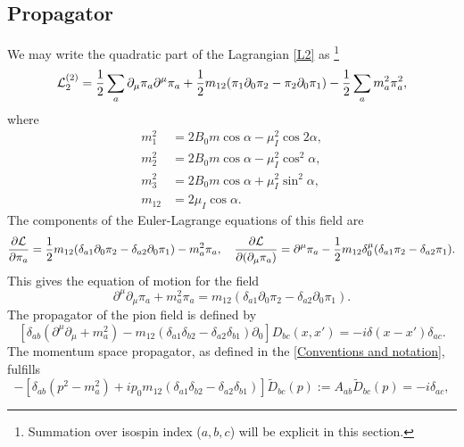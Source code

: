 \subsection{Propagator}
\label{section:propagator}
We may write the quadratic part of the Lagrangian \autoref{L2} as \footnote{Summation over isospin index ($a,b,c$) will be explicit in this section.}
\begin{align}
    \label{quadratic lagrangian}
    \mathcal{L}_2^{(2)}
    =
    \frac{1}{2} \sum_a \partial_\mu \pi_a \partial^\mu \pi_a
    + \frac{1}{2} m_{12} (\pi_1 \partial_0 \pi_2 - \pi_2 \partial_0 \pi_1)
    - \frac{1}{2} \sum_a m_a^2 \pi_a^2,
\end{align}
where
\begin{align}
    m_1^2 &= 2 B_0 m \cos{\alpha} - \mu_I^2 \cos{2\alpha}, \\
    m_2^2 &= 2 B_0 m \cos{\alpha} - \mu_I^2 \cos^2{\alpha}, \\
    m_3^2 &= 2 B_0 m \cos{\alpha} + \mu_I^2 \sin^2{\alpha}, \\
    m_{12} &= 2 \mu_I \cos{\alpha}.
\end{align}
The components of the Euler-Lagrange equations of this field are
\begin{equation*}
    \pdv{\mathcal{L}}{\pi_a} = 
    \frac{1}{2} m_{12} (\delta_{a1} \partial_0 \pi_2 - \delta_{a2}\partial_0 \pi_1) 
    - m^2_{a} \pi_a, \quad
    \pdv{\mathcal{L}}{(\partial_\mu \pi_a)} = 
    \partial^\mu \pi_a - \frac{1}{2} m_{12} \delta^\mu_0 (\delta_{a1}\pi_2  - \delta_{a2}\pi_1).
\end{equation*}
This gives the equation of motion for the field
\begin{equation}
    \partial^\mu \partial_\mu \pi_a + m_a^2 \pi_a
    =  m_{12}(\delta_{a1} \partial_0 \pi_2  - \delta_{a2} \partial_0 \pi_1).
\end{equation}
The propagator of the pion field is defined by
\begin{equation}
    \left[
        \delta_{ab}(\partial^\mu\partial_\mu + m^2_a)
        -  m_{12}(\delta_{a1} \delta_{b2} - \delta_{a2}\delta_{b1}) \partial_0
    \right] 
    D_{bc}(x, x') 
    = -i \delta(x - x') \delta_{ac}.
\end{equation}
The momentum space propagator, as defined in the \autoref{Conventions and notation}, fulfills
\begin{equation*}
    -\left[
        \delta_{ab}(p^2 - m_a^2)
        +  i p_0 m_{12}(\delta_{a1} \delta_{b2} - \delta_{a2}\delta_{b1}) 
    \right] 
    \tilde D_{bc}(p) 
    := A_{ab} \tilde D_{bc}(p) = -i \delta_{ac},
\end{equation*}

